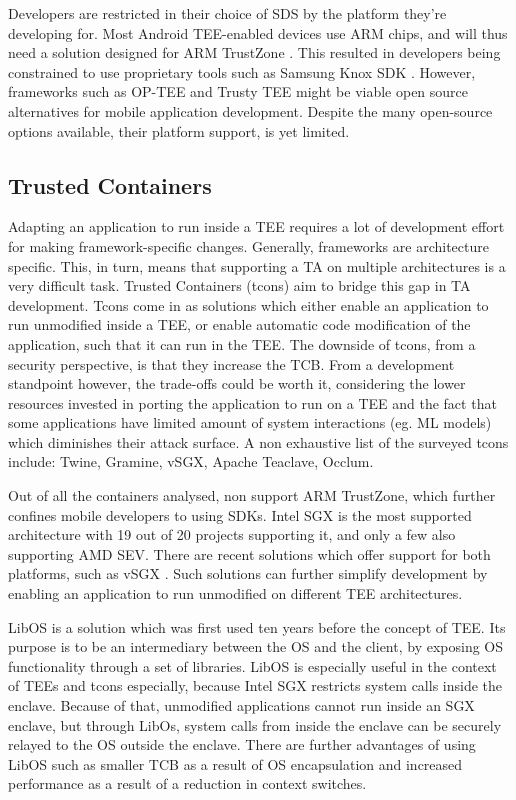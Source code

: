 \documentclass[runningheads,a4paper]{uwsese}
\begin{document}
Developers are restricted in their choice of SDS by the platform they're
developing for. Most Android TEE-enabled devices use ARM chips, and will thus
need a solution designed for ARM TrustZone \cite{arm_tz}. This resulted in
developers being constrained to use proprietary tools such as Samsung Knox SDK
\cite{knox_sdk}. However, frameworks such as OP-TEE \cite{optee} and Trusty TEE
\cite{trustytee} might be viable open source alternatives for mobile
application development. Despite the many open-source options available, their
platform support, is yet limited.

\subsection{Trusted Containers}

Adapting an application to run inside a TEE requires a lot of development
effort for making framework-specific changes. Generally, frameworks are
architecture specific. This, in turn, means that supporting a TA on multiple
architectures is a very difficult task. Trusted Containers (tcons) aim to
bridge this gap in TA development. Tcons come in as solutions which either
enable an application to run unmodified inside a TEE, or enable automatic code
modification of the application, such that it can run in the TEE. The downside
of tcons, from a security perspective, is that they increase the TCB. From a
development standpoint however, the trade-offs could be worth it, considering
the lower resources invested in porting the application to run on a TEE and the
fact that some applications have limited amount of system interactions (eg. ML
models) which diminishes their attack surface. A non exhaustive list of the
surveyed tcons include: Twine, Gramine, vSGX, Apache Teaclave, Occlum. 

Out of all the containers analysed, non support ARM TrustZone, which further
confines mobile developers to using SDKs. Intel SGX is the most supported
architecture with 19 out of 20 projects supporting it, and only a few also
supporting AMD SEV. There are recent solutions which offer support for both
platforms, such as vSGX \cite{vsgx}. Such solutions can further simplify
development by enabling an application to run unmodified on different TEE
architectures.

LibOS \cite{libos} is a solution which was first used ten years before the
concept of TEE. Its purpose is to be an intermediary between the OS and the
client, by exposing OS functionality through a set of libraries. LibOS is
especially useful in the context of TEEs and tcons especially, because Intel
SGX restricts system calls inside the enclave. Because of that, unmodified
applications cannot run inside an SGX enclave, but through LibOs, system calls
from inside the enclave can be securely relayed to the OS outside the enclave.
There are further advantages of using LibOS such as smaller TCB as a result of
OS encapsulation and increased performance as a result of a reduction in
context switches.
\end{document}
